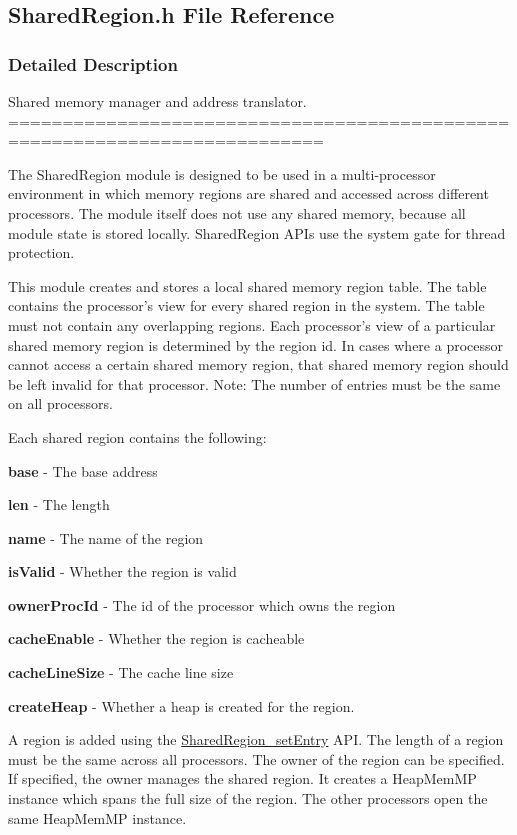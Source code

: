 \subsection{Shared\-Region.\-h File Reference}
\label{_shared_region_8h}


\subsubsection{Detailed Description}
Shared memory manager and address translator. ===========================================================================

The Shared\-Region module is designed to be used in a multi-\/processor environment in which memory regions are shared and accessed across different processors. The module itself does not use any shared memory, because all module state is stored locally. Shared\-Region A\-P\-Is use the system gate for thread protection.

This module creates and stores a local shared memory region table. The table contains the processor's view for every shared region in the system. The table must not contain any overlapping regions. Each processor's view of a particular shared memory region is determined by the region id. In cases where a processor cannot access a certain shared memory region, that shared memory region should be left invalid for that processor. Note\-: The number of entries must be the same on all processors.

Each shared region contains the following\-: \begin{DoxyItemize}
\item {\bfseries base} -\/ The base address \item {\bfseries len} -\/ The length \item {\bfseries name} -\/ The name of the region \item {\bfseries is\-Valid} -\/ Whether the region is valid \item {\bfseries owner\-Proc\-Id} -\/ The id of the processor which owns the region \item {\bfseries cache\-Enable} -\/ Whether the region is cacheable \item {\bfseries cache\-Line\-Size} -\/ The cache line size \item {\bfseries create\-Heap} -\/ Whether a heap is created for the region.\end{DoxyItemize}
A region is added using the \hyperlink{_shared_region_8h_a03f6986f76660e57a41ee312545e9f7d}{Shared\-Region\-\_\-set\-Entry} A\-P\-I. The length of a region must be the same across all processors. The owner of the region can be specified. If specified, the owner manages the shared region. It creates a Heap\-Mem\-M\-P instance which spans the full size of the region. The other processors open the same Heap\-Mem\-M\-P instance.

